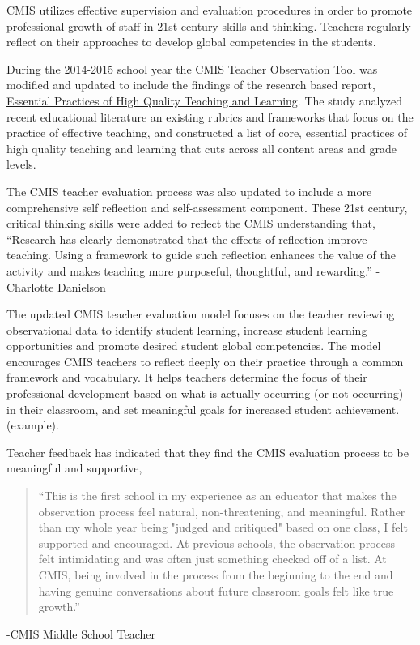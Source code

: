 
\begin{findings}
CMIS utilizes effective supervision and evaluation procedures in order to promote professional growth of staff in 21st century skills and thinking. Teachers regularly reflect on their approaches to develop global competencies in the students.

During the 2014-2015 school year the \href{https://docs.google.com/document/d/15_5X5QtixmWVheEUBVO9N1aislsLDm_ZW4-4g4YQ7F4/edit?usp=sharing}{CMIS Teacher Observation Tool} was modified and updated to include the findings of the research based report, \href{https://drive.google.com/a/cmis.ac.th/file/d/0Bwny3HLdIIS7bXJ0dEpCWG51MTQ/view?usp=sharing}{Essential Practices of High Quality Teaching and Learning}. The study analyzed recent educational literature an existing rubrics and frameworks that focus on the practice of effective teaching, and constructed a list of core, essential practices of high quality teaching and learning that cuts across all content areas and grade levels. 

The CMIS teacher evaluation process was also updated to include a more comprehensive self reflection and self-assessment component. These 21st century, critical thinking skills were added to reflect the CMIS understanding that, ``Research has clearly demonstrated that the effects of reflection improve teaching. Using a framework to guide such reflection enhances the value of the activity and makes teaching more purposeful, thoughtful, and rewarding.'' -\href{http://www.ascd.org/publications/books/106034/chapters/Using-the-Framework.aspx}{Charlotte Danielson} 

The updated CMIS teacher evaluation model focuses on the teacher reviewing observational data to identify student learning, increase student learning opportunities and promote desired student global competencies. The  model encourages CMIS teachers to reflect deeply on their practice through a common framework and vocabulary. It helps teachers determine the focus of their professional development based on what is actually occurring (or not occurring) in their classroom, and set meaningful goals for increased student achievement. (example).

Teacher feedback has indicated that they find the CMIS evaluation process to be meaningful and supportive,  

\blockquote{``This is the first school in my experience as an educator that makes the observation process feel natural, non-threatening, and meaningful. Rather than my whole year being "judged and critiqued" based on one class, I felt supported and encouraged. At previous schools, the observation process felt intimidating and was often just something checked off of a list. At CMIS, being involved in the process from the beginning to the end and having genuine conversations about future classroom goals felt like true growth.''}
                                                                                            -CMIS Middle School Teacher


\end{findings}
